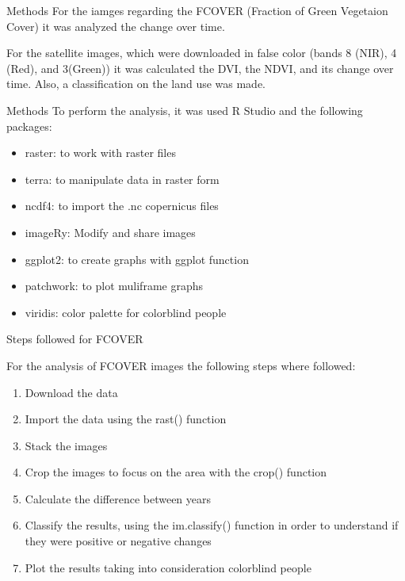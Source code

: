 \documentclass{beamer}
\begin{document}
\begin{frame}{Methods}
For the iamges regarding the FCOVER (Fraction of Green Vegetaion Cover) it was analyzed the change over time.

\bigskip

For the satellite images, which were downloaded in false color (bands 8 (NIR), 4 (Red), and 3(Green)) it was calculated the DVI, the NDVI, and its change over time. Also, a classification on the land use was made. 
\end{frame}

\begin{frame}{Methods}
To perform the analysis, it was used R Studio and the following packages:

\bigskip

\begin{itemize}
  \item raster: to work with raster files
  \item terra: to manipulate data in raster form
  \item ncdf4: to import the .nc copernicus files
  \item imageRy: Modify and share images
  \item ggplot2: to create graphs with ggplot function
  \item patchwork: to plot muliframe graphs
  \item viridis: color palette for colorblind people
 \end{itemize}
\end{frame}

\begin{frame}{Steps followed for FCOVER}

For the analysis of FCOVER images the following steps where followed:


\begin{enumerate}
  \item Download the data
  \item Import the data using the rast() function
  \item Stack the images
  \item Crop the images to focus on the area with the crop() function
  \item Calculate the difference between years
  \item Classify the results, using the im.classify() function in order to understand if they were positive or negative changes
  \item Plot the results taking into consideration colorblind people
  \end{enumerate}
\end{frame}
\end{document}
